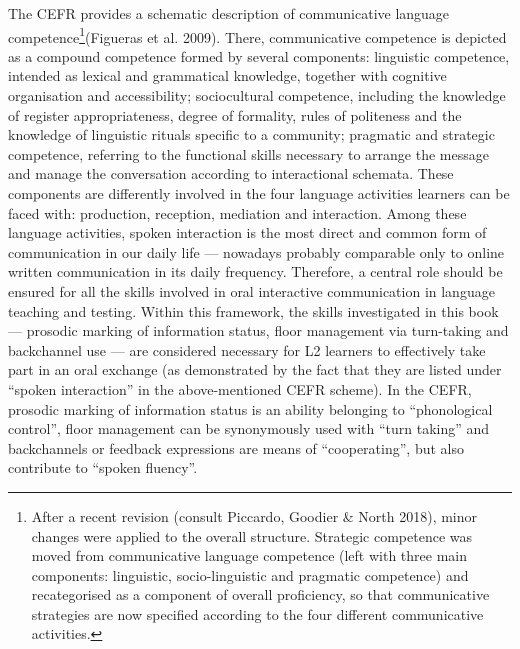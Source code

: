 \begin{styleStandard}
The CEFR provides a schematic description of communicative language competence\footnote{After a recent revision (consult Piccardo, Goodier \& North 2018), minor changes were applied to the overall structure. Strategic competence was moved from communicative language competence (left with three main components: linguistic, socio-linguistic and pragmatic competence) and recategorised as a component of overall proficiency, so that communicative strategies are now specified according to the four different communicative activities.}(Figueras et al. 2009). There, communicative competence is depicted as a compound competence formed by several components: linguistic competence, intended as lexical and grammatical knowledge, together with cognitive organisation and accessibility; sociocultural competence, including the knowledge of register appropriateness, degree of formality, rules of politeness and the knowledge of linguistic rituals specific to a community; pragmatic and strategic competence, referring to the functional skills necessary to arrange the message and manage the conversation according to interactional schemata. These components are differently involved in the four language activities learners can be faced with: production, reception, mediation and interaction. Among these language activities, spoken interaction is the most direct and common form of communication in our daily life — nowadays probably comparable only to online written communication in its daily frequency. Therefore, a central role should be ensured for all the skills involved in oral interactive communication in language teaching and testing. Within this framework, the skills investigated in this book — prosodic marking of information status, floor management via turn-taking and backchannel use — are considered necessary for L2 learners to effectively take part in an oral exchange (as demonstrated by the fact that they are listed under “spoken interaction” in the above-mentioned CEFR scheme). In the CEFR, prosodic marking of information status is an ability belonging to “phonological control”, floor management can be synonymously used with “turn taking” and backchannels or feedback expressions are means of “cooperating”, but also contribute to “spoken fluency”.
\end{styleStandard}


